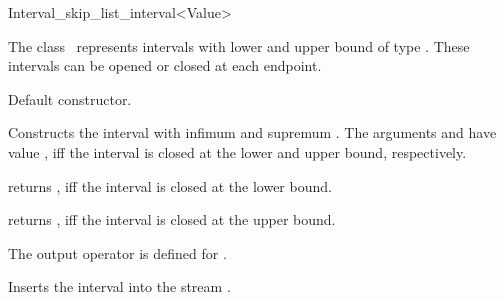 \begin{ccRefClass} {Interval_skip_list_interval<Value>}

\ccDefinition

The class \ccClassTemplateName\ represents intervals with lower and upper
bound of type . These intervals
 can be opened or closed at each endpoint.


\ccThreeToTwo



\ccCreation
{}

{Default constructor.}

{Constructs the interval with infimum  and supremum .
The arguments  and  have value , iff
the interval is closed at the lower and upper bound, respectively.}

\ccOperations


{returns , iff the interval is closed at the lower bound.}

{returns , iff the interval is closed at the upper bound.}


The output operator is defined for .

{Inserts the interval  into the stream .\\
}


\ccIsModel
{}

\end{ccRefClass}

